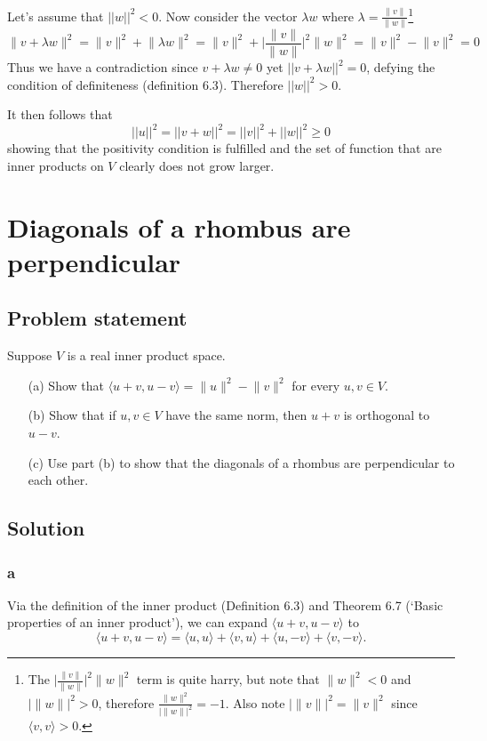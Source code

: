 \documentclass{article}
\providecommand{\abs}[1]{\lvert#1\rvert} \providecommand{\norm}[1]{\lVert#1\rVert}
\begin{document}
Let's assume that $||w||^2 < 0$. 
Now consider the vector $\lambda w$ where $\lambda=\frac{\norm{v}}{\norm{w}}$\footnote{
The $\abs{\frac{\norm{v}}{\norm{w}}}^2 \norm{w}^2$ term is quite harry, but note that $\norm{w}^2 < 0$ and $\abs{\norm{w}}^2 > 0$, therefore $\frac{\norm{w}^2}{\abs{\norm{w}}^2} = -1 $. Also note $\abs{\norm{v}}^2 = \norm{v}^2$ since $\langle v, v\rangle > 0$.
}
\[\norm{v+\lambda w}^2=\norm{v}^2+\norm{\lambda w}^2 = \norm{v}^2+\abs{\frac{\norm{v}}{\norm{w}}}^2 \norm{w}^2 = \norm{v}^2 - \norm{v}^2 = 0 \]
Thus we have a contradiction since $v+\lambda w\neq0$ yet $||v+\lambda w||^2=0$, defying the condition of definiteness (definition 6.3). Therefore $||w||^2 > 0$.

It then follows that 
\[||u||^2 = ||v+w||^2=||v||^2+||w||^2 \geq 0\]
showing that the positivity condition is fulfilled and the set of function that are inner products on $V$ clearly does not grow larger.

\clearpage

\section{Diagonals of a rhombus are perpendicular}
\subsection*{Problem statement}
Suppose $V$ is a real inner product space.
\begin{itemize}
    \item[(a)] Show that $\langle u+v,u-v\rangle=\norm{u}^2 - \norm{v}^2$ for every $u,v\in V$.
    \item[(b)] Show that if $u,v\in V$ have the same norm, then $u+v$ is orthogonal to $u-v$.
    \item[(c)] Use part (b) to show that the diagonals of a rhombus are perpendicular to each other.
\end{itemize}

\subsection*{Solution}

\subsubsection*{a}
Via the definition of the inner product (Definition 6.3) and Theorem 6.7 (`Basic properties of an inner product'), we can expand $\langle u+v,u-v\rangle$ to
\[\langle u+v,u-v\rangle=\langle u,u\rangle+\langle v,u\rangle + \langle u,-v\rangle + \langle v,-v\rangle.\]
\end{document}
